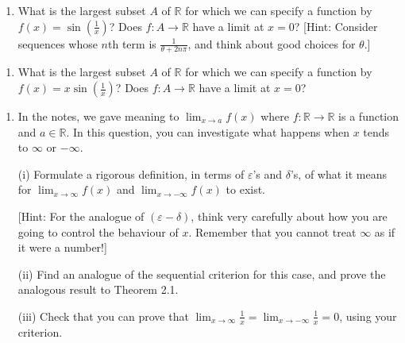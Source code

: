 \documentclass[letterpaper,10pt,english]{jupyterBook}
\begin{document}
\label{\detokenize{Problems:id9}}\begin{enumerate}
%
\setcounter{enumi}{8}
\item {} 
\sphinxAtStartPar
What is the largest subset \(A\) of \(\mathbb{R}\) for which we can specify a function by \(f(x) = \sin\left(\frac{1}{x}\right)\)? Does \(f:A\to\mathbb{R}\) have a limit at \(x = 0\)? {[}Hint: Consider sequences whose \(n\)th term is \(\frac{1}{\theta + 2n\pi}\), and think about good choices for \(\theta\).{]}

\end{enumerate}
\label{\detokenize{Problems:id10}}\begin{enumerate}
%
\setcounter{enumi}{9}
\item {} 
\sphinxAtStartPar
What is the largest subset \(A\) of \(\mathbb{R}\) for which we can specify a function by \(f(x) = x\sin\left(\frac{1}{x}\right)\)? Does \(f:A\to\mathbb{R}\)  have a limit at \(x = 0\)?

\end{enumerate}
\label{\detokenize{Problems:id11}}\begin{enumerate}
%
\setcounter{enumi}{10}
\item {} 
\sphinxAtStartPar
In the notes, we gave meaning to \(\displaystyle\lim_{x \rightarrow a} f(x)\) where \(f:\mathbb{R} \rightarrow \mathbb{R}\) is a function and \(a \in \mathbb{R}\). In this question, you can investigate what happens when \(x\) tends to \(\infty\) or \(-\infty\).

\sphinxAtStartPar
(i) Formulate a rigorous definition, in terms of \(\varepsilon\)’s and \(\delta\)’s, of what it means for \(\displaystyle\lim_{x \rightarrow \infty}f(x)\) and \(\displaystyle\lim_{x \rightarrow -\infty}f(x)\) to exist.

{[}Hint: For the analogue of \((\varepsilon-\delta)\), think very carefully about how you are going to control the behaviour of \(x\). Remember that you cannot treat \(\infty\) as if it were a number!{]}

\sphinxAtStartPar
(ii) Find an analogue of the sequential criterion for this case, and prove the analogous result to Theorem 2.1.

\sphinxAtStartPar
(iii) Check that you can prove that \(\displaystyle\lim_{x \rightarrow \infty}\frac{1}{x} = \lim_{x \rightarrow -\infty}\frac{1}{x} = 0\), using your criterion.

\end{enumerate}
\end{document}
